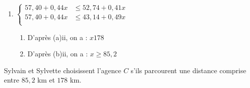 \begin{enumerate}
\begin{enumerate}
\item  $\begin{cases}
57,40+0,44x &\leqslant 52,74+0,41x\\
57,40+0,44x & \leqslant 43,14+0,49x\\
\end{cases}$  \\

\begin{enumerate}


\item  D'après (a)ii, on a : $x 178$ \\

\item 
 D'après (b)ii, on a : $x\geq 85,2$ \\

\end{enumerate}
\end{enumerate}
\end{enumerate}


Sylvain et Sylvette choisissent l'agence $C$ s'ils parcourent une distance comprise entre $85,2$ km et $178$ km. \\


